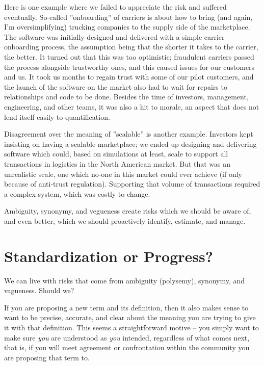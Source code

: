 \documentclass[graybox,envcountchap,sectrefs]{svmono}
\begin{document}

Here is one example where we failed to appreciate the risk and suffered eventually. So-called ''onboarding'' of carriers is about how to bring (and again, I'm oversimplifying) trucking companies to the supply side of the marketplace. The software was initially designed and delivered with a simple carrier onboarding process, the assumption being that the shorter it takes to the carrier, the better. It turned out that this was too optimistic; fraudulent carriers passed the process alongside trustworthy ones, and this caused issues for our customers and us. It took us months to regain trust with some of our pilot customers, and the launch of the software on the market also had to wait for repairs to relationships and code to be done. Besides the time of investors, management, engineering, and other teams, it was also a hit to morale, an aspect that does not lend itself easily to quantification.

Disagreement over the meaning of ''scalable'' is another example. Investors kept insisting on having a scalable marketplace; we ended up designing and delivering software which could, based on simulations at least, scale to support all transactions in logistics in the North American market. But that was an unrealistic scale, one which no-one in this market could ever achieve (if only because of anti-trust regulation). Supporting that volume of transactions required a complex system, which was costly to change. 

Ambiguity, synonymy, and vegueness create risks which we should be aware of, and even better, which we should proactively identify, estimate, and manage. 


\section{Standardization or Progress?}
\label{s:useful-disagreement}
We can live with risks that come from ambiguity (polysemy), synonymy, and vagueness. Should we? 

If you are proposing a new term and its definition, then it also makes sense to want to be precise, accurate, and clear about the meaning you are trying to give it with that definition. This seems a straightforward motive --  you simply want to make sure \textit{you} are understood as \textit{you} intended, regardless of what comes next, that is, if you will meet agreement or confrontation within the community you are proposing that term to.
\end{document}
